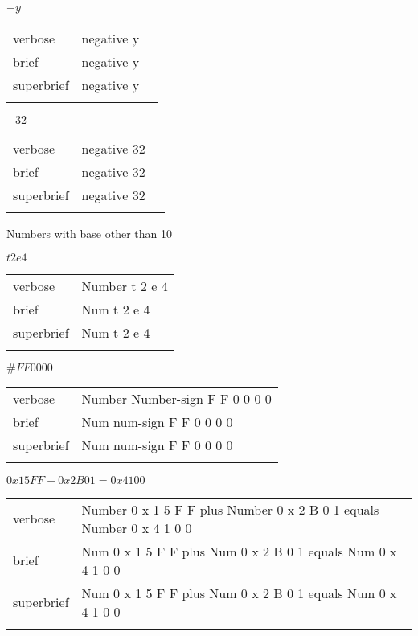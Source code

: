 \E $-y$
\begin{longtable}[c]{@{}lll@{}}
\toprule\addlinespace
verbose & negative y &

\\\addlinespace
brief & negative y &

\\\addlinespace
superbrief & negative y &

\\\addlinespace
\bottomrule
\end{longtable}


\E $-32$
\begin{longtable}[c]{@{}lll@{}}
\toprule\addlinespace
verbose & negative 32 &

\\\addlinespace
brief & negative 32 &

\\\addlinespace
superbrief & negative 32 &

\\\addlinespace
\bottomrule
\end{longtable}


\R
Numbers with base other than 10


\R
\E $t2e4$
\begin{longtable}[c]{@{}ll@{}}
\toprule\addlinespace
verbose & Number t 2 e 4
\\\addlinespace
brief & Num t 2 e 4
\\\addlinespace
superbrief & Num t 2 e 4
\\\addlinespace
\bottomrule
\end{longtable}


\E $\#FF0000$
\begin{longtable}[c]{@{}ll@{}}
\toprule\addlinespace
verbose & Number Number-sign F F 0 0 0 0
\\\addlinespace
brief & Num num-sign F F 0 0 0 0
\\\addlinespace
superbrief & Num num-sign F F 0 0 0 0
\\\addlinespace
\bottomrule
\end{longtable}


\E $0x15FF + 0x2B01 = 0x4100$
\begin{longtable}[c]{@{}ll@{}}
\toprule\addlinespace
verbose & Number 0 x 1 5 F F plus Number 0 x 2 B 0 1 equals Number 0 x 4
1 0 0
\\\addlinespace
brief & Num 0 x 1 5 F F plus Num 0 x 2 B 0 1 equals Num 0 x 4 1 0 0
\\\addlinespace
superbrief & Num 0 x 1 5 F F plus Num 0 x 2 B 0 1 equals Num 0 x 4 1 0 0
\\\addlinespace
\bottomrule
\end{longtable}


